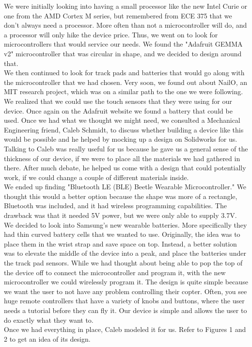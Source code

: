 \documentclass[12pt,letterpaper]{article}
\begin{document}
\hspace{1cm}We were initially looking into having a small processor like the new Intel Curie or one from the AMD Cortex M series, but remembered from ECE 375 that we don't always need a processor. More often than not a microcontroller will do, and a processor will only hike the device price. Thus, we went on to look for microcontrollers that would service our needs. We found the "Adafruit GEMMA v2" microcontroller that was circular in shape, and we decided to design around that.\\
\hspace{1cm}We then continued to look for track pads and batteries that would go along with the microcontroller that we had chosen. Very soon, we found out about NailO, an MIT research project, which was on a similar path to the one we were following. We realized that we could use the touch sensors that they were using for our device. Once again on the Adafruit website we found a battery that could be used. Once we had what we thought we might need, we consulted a Mechanical Engineering friend, Caleb Schmidt, to discuss whether building a device like this would be possible and he helped by mocking up a design on Solidworks for us.\\

\hspace{1cm}Talking to Caleb was really useful for us because he gave us a general sense of the thickness of our device, if we were to place all the materials we had gathered in there. After much debate, he helped us come with a design that could potentially work, if we could change a couple of different materials inside.\\
\hspace{1cm}We ended up finding "Bluetooth LE (BLE) Beetle Wearable Microcontroller." We thought this would a better option because the shape was more of a rectangle, Bluetooth was included, and it had wireless programming capabilities. The drawback was that it needed 5V power, but we were only able to supply 3.7V. We decided to look into Samsung's new wearable batteries. More specifically they had thin curved battery cells that we wanted to use. Originally, the idea was to place them in the wrist strap and save space on top. Instead, a better solution was to elevate the middle of the device into a peak, and place the batteries under the track pad sensors. While we had thought about being able to pop the top of the device off to connect the microcontroller and program it, with the new microcontroller we could wirelessly program it. The design is quite simple because we want the user to not have any problem controlling their copter. Often, you see huge remote controllers that have a variety of knobs and buttons, where the user needs a tutorial before they can fly it. Our device is simple and allows the user to do exactly what they want to.\\
Once we had everything in place, Caleb modeled it for us. Refer to Figures 1 and 2 to get an idea of its design.
\end{document}
